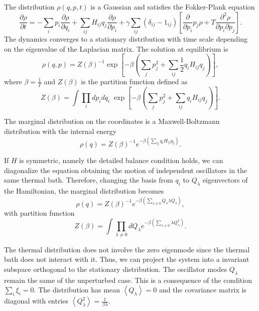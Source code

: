 The distribution $\rho(q,p,t)$ is a Gaussian and satisfies the Fokker-Plank equation \cite{Fokker}
\begin{equation}
    \frac{\partial\rho}{\partial t} = -\sum_i p_i\frac{\partial \rho}{\partial q_i} + \sum_{ij} H_{ij}q_j\frac{\partial \rho}{\partial p_i} + \gamma\sum_{ij}\left(\delta_{ij}-1_{ij}\right)\left[\frac{\partial}{\partial p_i}p_j\rho + T \frac{\partial^2\rho}{\partial p_i \partial p_j}\right].
\end{equation}
The dynamics converges to a stationary distribution with time scale depending on the eigenvalue of the Laplacian matrix.  
The solution at equilibrium is
\begin{equation}
    \rho(q,p) = Z(\beta)^{-1} \exp\left[ -\beta \left( \sum_j {p_j^2} + \sum_{ij} \frac{1}{2}q_iH_{ij}q_j\right)\right],
\end{equation}
where $\beta = \frac{1}{T}$ and $Z(\beta)$ is the partition function defined as
\begin{equation}
    Z(\beta) = \int \prod_i dp_i dq_i \; \exp\left[ -\beta \left( \sum_j {p_j^2} + \sum_{ij} q_iH_{ij}q_j\right)\right].
\end{equation}

The marginal distribution on the coordinates is a Maxwell-Boltzmann distribution with the internal energy 
\begin{equation}
    \rho(q) = Z(\beta)^{-1} e^{-\beta \left(\sum_{ij} q_iH_{ij}q_j\right)}.
\end{equation}

If $H$ is symmetric, namely the detailed balance condition holds, we can diagonalize the equation obtaining the motion of independent oscillators in the same thermal bath.
Therefore, changing the basis from $q_i$ to $Q_\lambda$ eigenvectors of the Hamiltonian, the marginal distribution becomes
\begin{equation}\label{marginal_probability}
    \rho(q) = Z(\beta)^{-1} e^{-\beta \left(\sum_{\lambda \neq 0} Q_\lambda \lambda Q_\lambda\right)},
\end{equation}
with partition function 
\begin{equation}
    Z(\beta) = \int \prod_{\lambda\neq 0} dQ_\lambda e^{-\beta \left(\sum_{\lambda \neq 0} \lambda Q_\lambda^2\right)}.
\end{equation}

The thermal distribution does not involve the zero eigenmode since the thermal bath does not interact with it. Thus, we can project the system into a invariant subspace orthogonal to the stationary distribution. The oscillator modes $Q_\lambda$ remain the same of the unperturbed case. 
This is a consequence of the condition $\sum_i \xi_i = 0$.
The distribution has mean $\left<Q_\lambda\right>= 0$ and the covariance matrix is diagonal with entries $\left<Q^2_\lambda\right>= \frac{1}{\beta \lambda}$.

